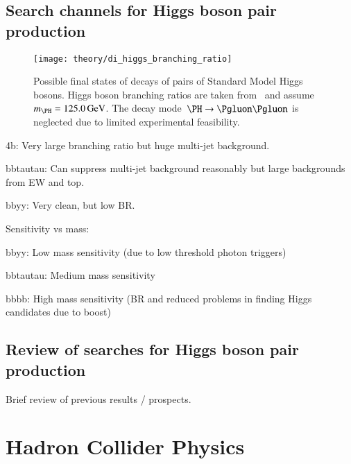 \subsection{Search channels for Higgs boson pair production}

\begin{figure}[htbp]
  \centering
  \texttt{[image: theory/di\_higgs\_branching\_ratio]}
  \caption{Possible final states of decays of pairs of Standard Model
    Higgs bosons. Higgs boson branching ratios are taken
    from~\cite{deFlorian:2016spz} and
    assume~$m_{\PH} = \SI{125.0}{\GeV}$. The decay
    mode~$\PH \ra \Pgluon\Pgluon$ is neglected due to limited
    experimental feasibility.}
  \label{fig:hh_branching_ratios}
\end{figure}

4b: Very large branching ratio but huge multi-jet background.

bbtautau: Can suppress multi-jet background reasonably but large
backgrounds from EW and top.

bbyy: Very clean, but low BR.



Sensitivity vs mass:

bbyy: Low mass sensitivity (due to low threshold photon triggers)

bbtautau: Medium mass sensitivity

bbbb: High mass sensitivity (BR and reduced problems in finding Higgs
candidates due to boost)


\subsection{Review of searches for Higgs boson pair production}

Brief review of previous results / prospects.


\section{Hadron Collider Physics}


